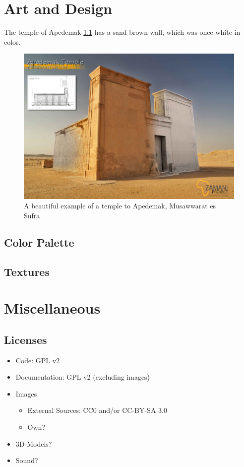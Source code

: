 \documentclass[a4paper,12pt]{scrreprt}
\begin{document}
\chapter{Art and Design}

The temple of Apedemak \ref{fig:apedemak-temple} has a sand brown wall, which was once white in color.

\begin{figure}[H]
	\centering
	\includegraphics[width=\textwidth]{img/temple/apedemak_temple}
	\caption{A beautiful example of a temple to Apedemak, Musawwarat es Sufra}\label{fig:apedemak-temple}
\end{figure}

\section{Color Palette}

\section{Textures}

\chapter{Miscellaneous}

\section{Licenses}

\begin{itemize}
	\item Code: GPL v2
	\item Documentation: GPL v2 (excluding images)
	\item Images
	\begin{itemize}
		\item External Sources: CC0 and/or CC-BY-SA 3.0
		\item Own?
	\end{itemize}
	\item 3D-Models?
	\item Sound?
\end{itemize}
\end{document}
